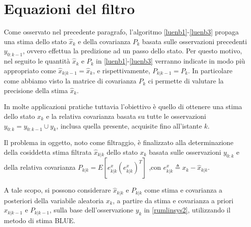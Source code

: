 \section{Equazioni del filtro}

Come osservato nel precedente paragrafo, l’algoritmo \eqref{luenb1}-\eqref{luenb3} propaga una stima dello stato $\hat{x}_k$ e della covarianza $P_k$ basata sulle osservazioni precedenti $y_{0:k-1}$, ovvero effettua la predizione ad un passo dello stato. Per questo motivo, nel seguito le quantità $\hat{x}_k$ e $P_k$ in \eqref{luenb1}-\eqref{luenb3} verranno indicate in modo più appropriato come $\hat{x}_{k|k-1}=\hat{x}_k$, e rispettivamente, $P_{k|k-1}=P_k$.
In particolare come abbiamo visto la matrice di covarianza $P_k$ ci permette di valutare la precisione della stima $\hat{x}_k$.

In molte applicazioni pratiche tuttavia l’obiettivo è quello di ottenere una stima dello stato $x_k$ e la relativa covarianza basata su tutte le osservazioni $y_{0:k}  = y_{0:k-1}\cup{y_k}$, inclusa quella presente, acquisite fino all’istante $k$.

Il problema in oggetto, noto come filtraggio, è finalizzato alla determinazione della cosiddetta stima filtrata $\hat{x}_{k|k}$ dello stato $x_k$ basata sulle osservazioni $y_{0:k}$ e della relativa covarianza $P_{k|k} = E[e^x_{k|k}(e^x_{k|k})^T]$ ,con $e^x_{k|k}\triangleq x_k-\hat{x}_{k|k}$. 

A tale scopo, si possono considerare $\hat{x}_{k|k}$ e $P_{k|k}$ come stima e covarianza a posteriori della variabile aleatoria $x_k$, a partire da stima e covarianza a priori $\hat{x}_{k|k-1}$ e $P_{k|k-1}$, sulla base dell'osservazione $y_k$ in \eqref{rumlinsys2}, utilizzando il metodo di stima BLUE.

